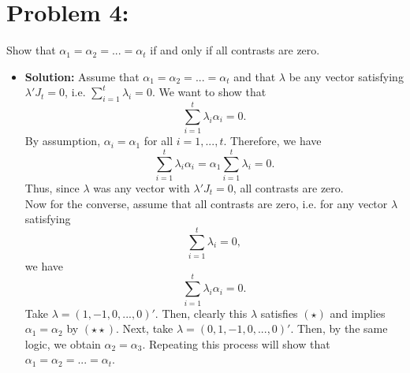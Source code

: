 \documentclass[11pt]{article}
\begin{document}
\section*{Problem 4:}  Show that $\alpha_1 = \alpha_2 = ... = \alpha_t$ if and only if all contrasts are zero.
\begin{itemize}
\item[] {\bf Solution:}  Assume that $\alpha_1 = \alpha_2 = ... = \alpha_t$ and that $\lambda$ be any vector satisfying $\lambda' J_{t} = 0$, i.e. $\sum_{i=1}^t \lambda_i = 0$.  We want to show that
\[
\sum_{i=1}^t\lambda_i \alpha_i = 0.
\]
By assumption, $\alpha_i = \alpha_1$ for all $i=1,...,t$.  Therefore, we have
\[
\sum_{i=1}^t\lambda_i \alpha_i = \alpha_1\sum_{i=1}^t\lambda_i = 0.
\]
Thus, since $\lambda$ was any vector with $\lambda' J_{t} = 0$, all contrasts are zero. \\
Now for the converse, assume that all contrasts are zero, i.e. for any vector $\lambda$ satisfying
\[
\sum_{i=1}^t \lambda_i = 0, \tag{$\star$}
\]
we have
\[
\sum_{i=1}^t \lambda_i\alpha_i = 0. \tag{$\star\star$}
\]
Take $\lambda = (1,-1,0,...,0)'$.  Then, clearly this $\lambda$ satisfies $(\star)$ and implies $\alpha_1 = \alpha_2$ by $(\star\star)$.  Next, take $\lambda = (0,1,-1,0,...,0)'$.  Then, by the same logic, we obtain $\alpha_2 = \alpha_3$.  Repeating this process will show that $\alpha_1 = \alpha_2 = ... = \alpha_t$.
\end{itemize}

\newpage
\end{document}
